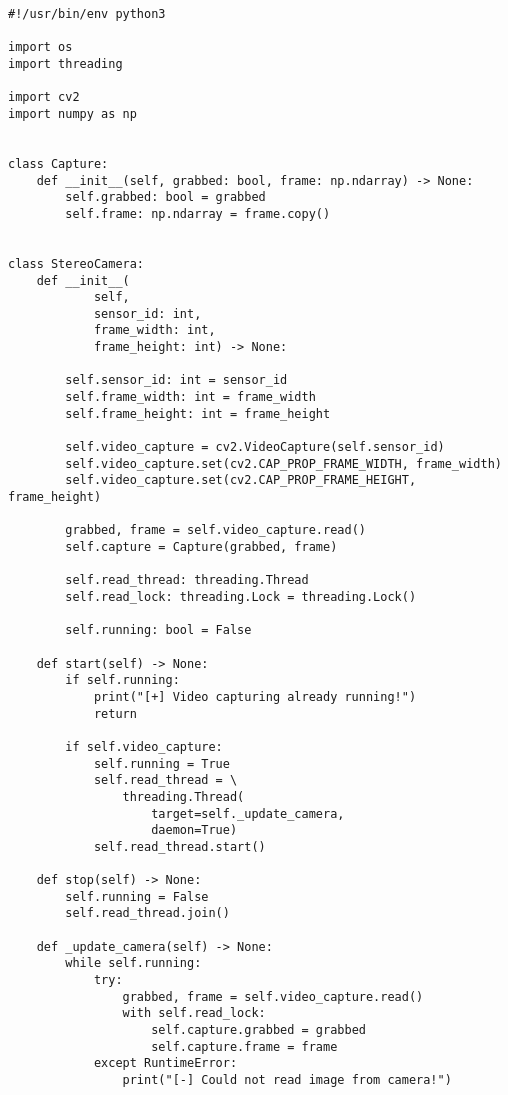 
\begin{verbatim}
#!/usr/bin/env python3

import os
import threading

import cv2
import numpy as np


class Capture:
    def __init__(self, grabbed: bool, frame: np.ndarray) -> None:
        self.grabbed: bool = grabbed
        self.frame: np.ndarray = frame.copy()


class StereoCamera:
    def __init__(
            self,
            sensor_id: int,
            frame_width: int,
            frame_height: int) -> None:
        
        self.sensor_id: int = sensor_id
        self.frame_width: int = frame_width
        self.frame_height: int = frame_height

        self.video_capture = cv2.VideoCapture(self.sensor_id)
        self.video_capture.set(cv2.CAP_PROP_FRAME_WIDTH, frame_width)
        self.video_capture.set(cv2.CAP_PROP_FRAME_HEIGHT, frame_height)

        grabbed, frame = self.video_capture.read()
        self.capture = Capture(grabbed, frame)

        self.read_thread: threading.Thread
        self.read_lock: threading.Lock = threading.Lock()

        self.running: bool = False

    def start(self) -> None:
        if self.running:
            print("[+] Video capturing already running!")
            return

        if self.video_capture:
            self.running = True
            self.read_thread = \
                threading.Thread(
                    target=self._update_camera,
                    daemon=True)
            self.read_thread.start()

    def stop(self) -> None:
        self.running = False
        self.read_thread.join()

    def _update_camera(self) -> None:
        while self.running:
            try:
                grabbed, frame = self.video_capture.read()
                with self.read_lock:
                    self.capture.grabbed = grabbed
                    self.capture.frame = frame
            except RuntimeError:
                print("[-] Could not read image from camera!")


\end{verbatim}
